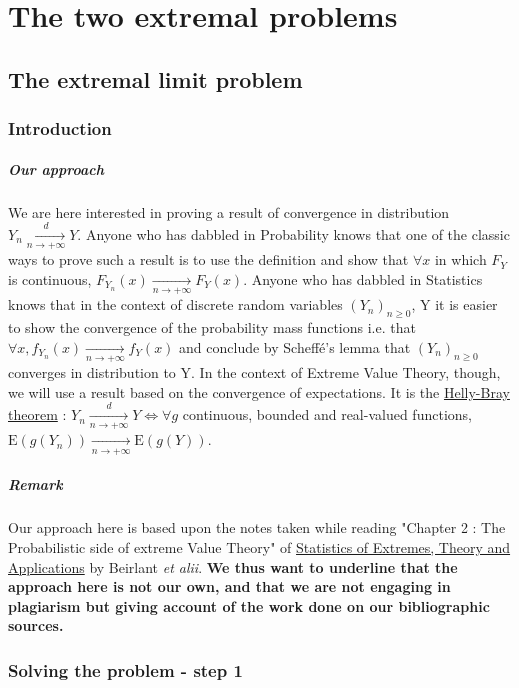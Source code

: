 \chapter{The two extremal problems}
 \section{The extremal limit problem}
 \subsection{Introduction}
\paragraph{Our approach} We are here interested in proving a result of convergence in distribution $Y_n \xrightarrow[n \rightarrow + \infty]{d} Y$. Anyone who has dabbled in Probability knows that one of the classic ways to prove such a result is to use the definition and show that $\forall x$ in which $F_Y$ is continuous, $F_{Y_n}(x) \xrightarrow[n \rightarrow + \infty]{} F_Y(x)$. Anyone who has dabbled in Statistics knows that in the context of discrete random variables $(Y_n)_{n \ge 0}$, Y it is easier to show the convergence of the probability mass functions i.e. that $\forall x, f_{Y_n}(x) \xrightarrow[n \rightarrow + \infty]{} f_Y(x)$ and conclude by Scheffé's lemma that $(Y_n)_{n \ge 0}$ converges in distribution to Y. In the context of Extreme Value Theory, though, we will use a result based on the convergence of expectations. It is the \underline{Helly-Bray theorem} : \newline $Y_n \xrightarrow[n \rightarrow + \infty]{d} Y \iff \forall g$ continuous, bounded and real-valued functions, $\mathrm{E}(g(Y_n)) \xrightarrow[n \rightarrow + \infty]{} \mathrm{E}(g(Y))$.
\paragraph{Remark} Our approach here is based upon the notes taken while reading "Chapter 2 : The Probabilistic side of extreme Value Theory" of \underline{Statistics of Extremes, Theory and Applications} by Beirlant \textit{et alii}. \textbf{We thus want to underline that the approach here is not our own, and that we are not engaging in plagiarism but giving account of the work done on our bibliographic sources.} 
\subsection{Solving the problem - step 1}
